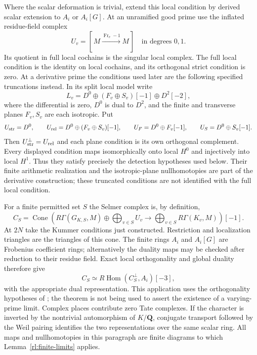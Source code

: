 Where the scalar deformation is trivial, extend this local condition by
derived scalar extension to $A_i$ or $A_i[G]$.  At an unramified good prime
use the inflated residue-field complex
\[
 U_v=[\,M\xrightarrow{\operatorname{Fr}_v-1}M\,]
 \quad\text{in degrees }0,1.
\]
Its quotient in full local cochains is the singular local complex.
The full local condition is the identity on local cochains, and its
orthogonal strict condition is zero.  At a derivative prime the
conditions used later are the following specified truncations instead.
In its split local model write
\[
 L_v=D^0\oplus(F_v\oplus S_v)[-1]\oplus D^2[-2],
\]
where the differential is zero, $D^0$ is dual to $D^2$, and the finite
and transverse planes $F_v,S_v$ are each isotropic.  Put
\[
 U_{\rm str}=D^0,\qquad
 U_{\rm rel}=D^0\oplus(F_v\oplus S_v)[-1],\qquad
 U_F=D^0\oplus F_v[-1],\qquad U_S=D^0\oplus S_v[-1].
\]
Then $U_{\rm str}^{\perp}=U_{\rm rel}$ and each plane condition is
its own orthogonal complement.  Every displayed condition maps
isomorphically onto local $H^0$ and injectively into local $H^1$.
Thus they satisfy precisely the detection hypotheses used below.
Their finite arithmetic realization and the isotropic-plane
nullhomotopies are part of the derivative construction; these
truncated conditions are not identified with the full local condition.

For a finite permitted set $S$ the Selmer complex is, by definition,
\begin{equation}\label{rl:selmer-definition}
 C_S=\operatorname{Cone}\left(
 R\Gamma(G_{K,S},M)\oplus\bigoplus_{v\in S}U_v
 \longrightarrow\bigoplus_{v\in S}R\Gamma(K_v,M)
 \right)[-1].
\end{equation}
At $2N$ take the Kummer conditions just constructed.  Restriction and
localization triangles are the triangles of this cone.  The finite rings
$A_i$ and $A_i[G]$ are Frobenius coefficient rings; alternatively the
duality maps may be checked after reduction to their residue field.
Exact local orthogonality and global duality therefore give
\begin{equation}\label{rl:global-duality}
 C_S\simeq R\operatorname{Hom}(C_S^{\perp},A_i)[-3],
\end{equation}
with the appropriate dual representation.  This application uses the
orthogonality hypotheses of
\cite[Theorem~6.3.4]{Nekovar2006}; the theorem is not being used to assert
the existence of a varying-prime limit.  Complex places contribute zero
Tate complexes.  If the character is inverted by the nontrivial
automorphism of $K/\mathbf Q$, conjugate transport followed by the Weil
pairing identifies the two representations over the same scalar ring.
All maps and nullhomotopies in this paragraph are finite diagrams to
which Lemma~\ref{rl:finite-limits} applies.

